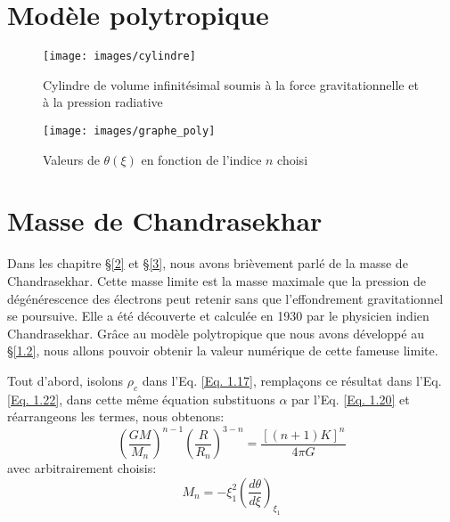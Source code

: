 


\appendix

\chapter{Modèle polytropique}\label{Annexe A}

\begin{figure}[H]
	\centering
	\texttt{[image: images/cylindre]}
	\caption[Cylindre de volume infinitésimal soumis à la force gravitationnelle et à la pression radiative - figure réalisée avec GeoGebra]{Cylindre de volume infinitésimal soumis à la force gravitationnelle et à la pression radiative}
	\label{Fig. A.1}
\end{figure}\bigskip

\begin{figure}[H]
	\centering
	\texttt{[image: images/graphe\_poly]}
	\caption[Valeurs de $\theta \left( \xi\right) $ en fonction de l'indice $n$ choisi]{Valeurs de $\theta \left( \xi\right) $ en fonction de l'indice $n$ choisi}
	\label{Fig. A.2}
\end{figure}\bigskip


\chapter{Masse de Chandrasekhar}\label{Annexe B}

Dans les chapitre §\ref{2} et §\ref{3}, nous avons brièvement parlé de la masse de Chandrasekhar. Cette masse limite est la masse maximale que la pression de dégénérescence des électrons peut retenir sans que l'effondrement gravitationnel se poursuive. Elle a été découverte et calculée en 1930 par le physicien indien Chandrasekhar.  Grâce au modèle polytropique que nous avons développé au §\ref{1.2}, nous allons pouvoir obtenir la valeur numérique de cette fameuse limite.\bigskip

Tout d'abord, isolons $\rho_c$ dans l'Eq. \ref{Eq. 1.17}, remplaçons ce résultat dans l'Eq. \ref{Eq. 1.22},  dans cette même équation substituons $\alpha$ par l'Eq. \ref{Eq. 1.20} et réarrangeons les termes, nous obtenons: \begin{equation}\left( \dfrac{GM}{M_{n}}\right)^{n-1} \left( \dfrac{R}{R_{n}}\right)^{3-n}=\dfrac{\left[ \left( n+1\right)K\right]^n}{4\pi G}\label{Eq. 7.1}\end{equation}
avec arbitrairement choisis:
\begin{equation}M_{n}=-\xi_{1}^{2}\left( \dfrac{d\theta}{d\xi}\right)_{\xi_{1}}\label{Eq. 7.2}\end{equation}

